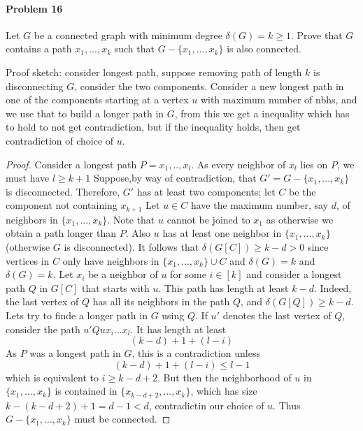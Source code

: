\paragraph{Problem 16}
Let $G$ be a connected graph with minimum degree $\delta(G) = k \geq 1$. Prove
that $G$ contains a path $x_1,...,x_k$ such that $G - \{x_1,...,x_k\}$ is 
also connected. 

\bigskip
Proof sketch: consider longest path, suppose removing path of length $k$ is 
disconnecting $G$, consider the two components. Consider a new longest path 
in one of the components starting at a vertex $u$ with maximum number of nbhs,
and we use that to build a longer path in $G$,
from this we get a inequality which has to hold to not get contradiction,
but if the inequality holds, then get contradiction of choice of $u$.

\begin{proof}
    Consider a longest path $P = x_1,..,x_l$. As every neighbor of $x_l$ lies 
    on $P$, we must have $l \geq k+1$ Suppose,by way of contradiction, that 
    $G' = G - \{x_1,...,x_k\}$ is disconnected. Therefore, $G'$ has at least 
    two components; let $C$ be the component not containing $x_{k+1}$
    Let $u \in C$ have the maximum number, say $d$, of neighbors in 
    $\{x_1,...,x_k\}$. Note that $u$ cannot be joined to $x_1$ as otherwise we 
    obtain a path longer than $P$. Also $u$ has at least one neighbor in 
    $\{x_1,...,x_k\}$ (otherwise $G$ is disconnected).
    It follows that $\delta(G[C]) \geq k-d > 0$ since vertices in $C$ only have
    neighbors in $\{x_1,...,x_k\} \cup C$ and $\delta(G) = k$  and 
    $\delta(G) = k$. Let $x_i$ be a neighbor of $u$ for some $i \in [k]$ and 
    consider a longest path $Q$ in $G[C]$ that starts with $u$. This path 
    has length at least $k-d$. Indeed, the last vertex of $Q$ has all its 
    neighbors in the path $Q$, and $\delta(G[Q]) \geq k-d$. Lets try to finde
    a longer path in $G$ using $Q$. If $u'$ denotes the last vertex of $Q$, 
    consider the path $u'Qux_i...x_l$. It has length at least 
    $$ (k-d) + 1 + (l-i) $$
    As $P$ was a longest path in $G$, this is a contradiction unless 
    $$ (k-d) + 1 + (l-i) \leq l-1 $$
    which is equivalent to $i \geq k - d+2$. But then the neighborhood of $u$
    in $\{x_1,...,x_k\}$ is contained in $\{x_{k-d+2},...,x_k\}$, which has 
    size $k-(k-d+2)+1 = d-1 < d$, contradictin our choice of $u$. Thus
    $G-\{x_1,...,x_k\}$ must be connected.
\end{proof}
